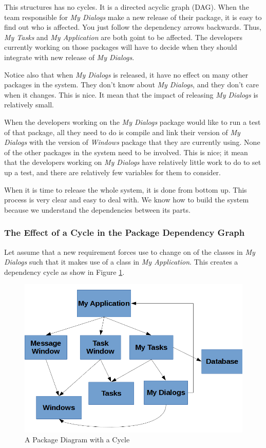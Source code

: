 \documentclass[12pt]{report}
\begin{document}
This structures has no cycles. It is a directed acyclic graph (DAG). 
When the team responsible for {\it My Dialogs} make a new release of 
their package, it is easy to find out who is affected. 
You just follow the dependency arrows backwards.
Thus, {\it My Tasks} and {\it My Application} are both goint to be affected.
The developers currently working on those packages will have to decide when 
they should integrate with new release of \textit{My Dialogs}.

Notice also that when \textit{My Dialogs} is released, it have no effect on
many other packages in the system. They don't know about \textit{My Dialogs}, and they don't care when it changes. This is nice. It mean that the impact
of releasing \textit{My Dialogs} is relatively small.

When the developers working on the \textit{My Dialogs} package would like 
to run a test of that package, all they need to do is compile and link their
version of \textit{My Dialogs} with the version of \textit{Windows} package
that they are currently using. None of the other packages in the system need
to be involved. 
This is nice; it mean that the developers working on \textit{My Dialogs} 
have relatively little work to do to set up a test, and there are 
relatively few variables for them to consider.

When it is time to release the whole system, it is done from bottom up. 
This process is very clear and easy to deal with. 
We know how to build the system because we understand the dependencies
between its parts.

\subsubsection{The Effect of a Cycle in the Package Dependency Graph}

Let assume that a new requirement forces use to change on of the classes
in \textit{My Dialogs} such that it makes use of a class in \textit{My Application}. This creates a dependency cycle as show in Figure \ref{NonDAG}.

\begin{figure}[H]
    \centering
    \includegraphics[width=\textwidth]{uml/NonDAG.png}
    \caption{A Package Diagram with a Cycle}
    \label{NonDAG}
\end{figure}
\end{document}
